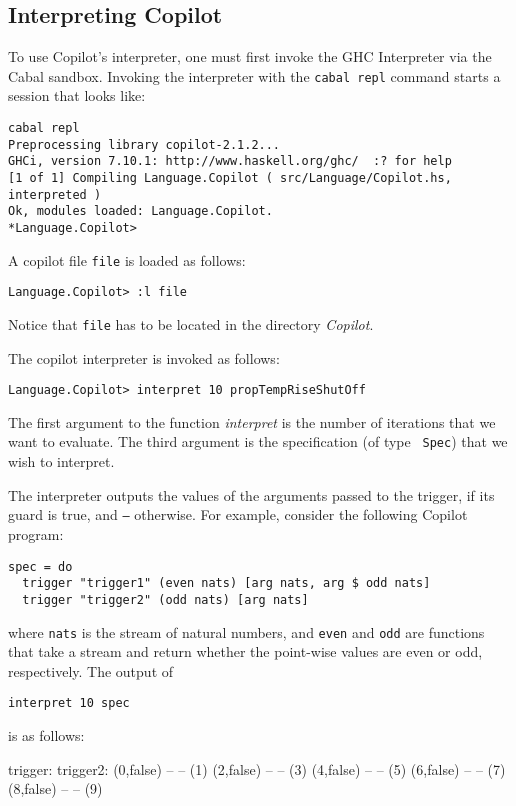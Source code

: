 \subsection{Interpreting Copilot}
To use Copilot's interpreter, one must first invoke the GHC Interpreter via
the Cabal sandbox. Invoking the interpreter with the \texttt{cabal
repl} command starts a session that looks like: 

%
\begin{lstlisting}[language = Copilot]
cabal repl
Preprocessing library copilot-2.1.2...
GHCi, version 7.10.1: http://www.haskell.org/ghc/  :? for help
[1 of 1] Compiling Language.Copilot ( src/Language/Copilot.hs, interpreted )
Ok, modules loaded: Language.Copilot.
*Language.Copilot> 
\end{lstlisting}
%

A copilot file \texttt{file} is loaded as follows:
%
\begin{lstlisting}[language = Copilot]
Language.Copilot> :l file
\end{lstlisting}

Notice that \texttt{file} has to be located
in the directory \emph{Copilot}.

The copilot interpreter is invoked as follows:
%
\begin{lstlisting}[language = Copilot]
Language.Copilot> interpret 10 propTempRiseShutOff
\end{lstlisting}
%
The first argument to the function \emph{interpret} is the number of iterations
that we want to evaluate. The third argument is the specification (of type {\tt
Spec}) that we wish to interpret.

The interpreter outputs the values of the arguments passed to the trigger, if
its guard is true, and {\tt --} otherwise. For example, consider the following
Copilot program:
%
\begin{lstlisting}[language = Copilot]
spec = do
  trigger "trigger1" (even nats) [arg nats, arg $ odd nats]
  trigger "trigger2" (odd nats) [arg nats]
\end{lstlisting}
where {\tt nats} is the stream of natural numbers, and {\tt even} and {\tt odd}
are functions that take a stream and return whether the point-wise values are
even or odd, respectively. The output of
%
\begin{lstlisting}[language = Copilot]
interpret 10 spec
\end{lstlisting}
%
is as follows:
%
\begin{code}
trigger:   trigger2:
(0,false)  --
--         (1)
(2,false)  --
--         (3)
(4,false)  --
--         (5)
(6,false)  --
--         (7)
(8,false)  --
--         (9)
\end{code}
%

